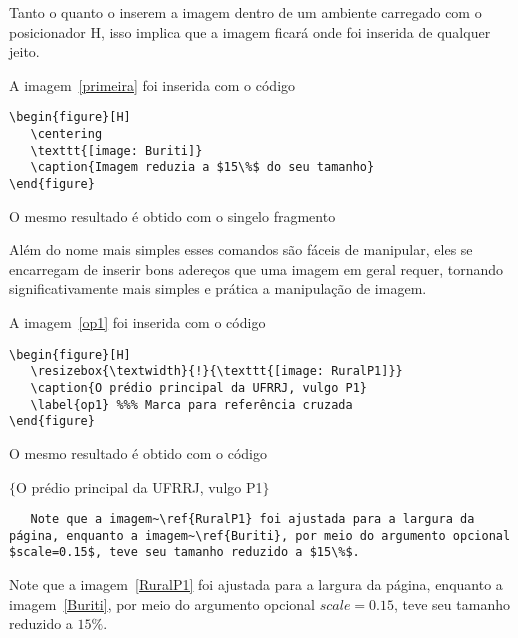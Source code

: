 Tanto o  quanto o  inserem a imagem 
dentro de um ambiente  carregado com o posicionador H, 
isso implica que a imagem ficará onde foi inserida de qualquer jeito.

A imagem~\ref{primeira} foi inserida com o código
\begin{tcolorbox}
\begin{lstlisting}
\begin{figure}[H]
   \centering
   \texttt{[image: Buriti]}
   \caption{Imagem reduzia a $15\%$ do seu tamanho}
\end{figure}
\end{lstlisting}
\end{tcolorbox}

O mesmo resultado é obtido com o singelo fragmento
\begin{center}
\end{center}

Além do nome mais simples esses comandos são fáceis de manipular, eles 
se encarregam de inserir bons adereços que uma imagem em geral requer, 
tornando significativamente mais simples e prática a manipulação de imagem.

A imagem~\ref{op1} foi inserida com o código
\begin{tcolorbox}
\begin{lstlisting}
\begin{figure}[H]
   \resizebox{\textwidth}{!}{\texttt{[image: RuralP1]}}
   \caption{O prédio principal da UFRRJ, vulgo P1}
   \label{op1} %%% Marca para referência cruzada
\end{figure}
\end{lstlisting}
\end{tcolorbox}
O mesmo resultado é obtido com o código

\begin{center}
$\{$O prédio principal da UFRRJ, vulgo P1$\}$
\end{center}

\begin{tcolorbox}
\begin{lstlisting}
   Note que a imagem~\ref{RuralP1} foi ajustada para a largura da página, enquanto a imagem~\ref{Buriti}, por meio do argumento opcional $scale=0.15$, teve seu tamanho reduzido a $15\%$.
\end{lstlisting}
\tcblower
Note que a imagem~\ref{RuralP1} foi ajustada para a largura da página, enquanto a imagem~\ref{Buriti}, por meio do argumento opcional $scale=0.15$, teve seu tamanho reduzido a $15\%$.
\end{tcolorbox}


